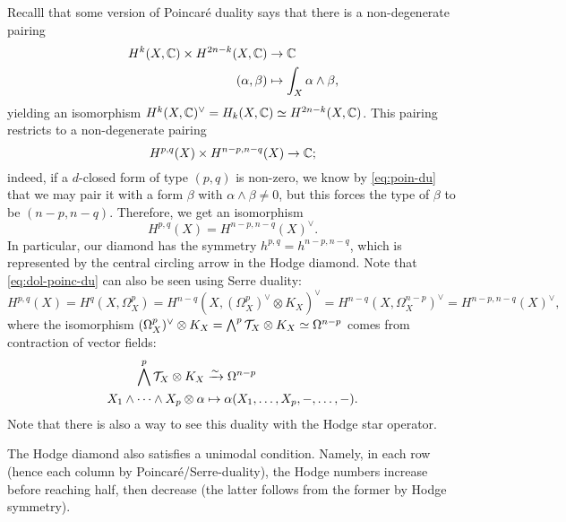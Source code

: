 \begin{remark}
	Recalll that some version of Poincaré duality says that there is a non-degenerate pairing
	\begin{align}
	H^k(X,\mathbb C)\times H^{2n-k}(X,\mathbb C)&\to \mathbb C\label{eq:poin-du}\\
	(\alpha,\beta)&\mapsto\int_X\alpha\wedge\beta,\notag
	\end{align}
	yielding an isomorphism $H^k(X,\mathbb C)^\vee=H_k(X,\mathbb C)\simeq H^{2n-k}(X,\mathbb C)$.  This pairing restricts to a non-degenerate pairing
	\[
	H^{p,q}(X)\times H^{n-p,n-q}(X)\to\mathbb C;
	\]
	indeed, if a $d$-closed form of type $(p,q)$ is non-zero, we know by \eqref{eq:poin-du} that we may pair it with a form $\beta$ with $\alpha\wedge\beta\neq 0$, but this forces the type of $\beta$ to be $(n-p,n-q)$. Therefore, we get an isomorphism
	\begin{equation}
	H^{p,q}(X)=H^{n-p,n-q}(X)^\vee.\label{eq:dol-poinc-du}
	\end{equation}
	 In particular, our diamond has the symmetry $h^{p,q}=h^{n-p,n-q}$, which is represented by the central circling arrow in the Hodge diamond. Note that \eqref{eq:dol-poinc-du} can also be seen using Serre duality:
	 \[
	 H^{p,q}(X)=H^q(X,\Omega_X^p)=H^{n-q}(X,(\Omega_X^p)^\vee\otimes K_X)^\vee=H^{n-q}(X,\Omega_X^{n-p})^\vee=H^{n-p,n-q}(X)^\vee,
	 \]
	where the isomorphism $(\Omega_X^p)^\vee\otimes K_X=\bigwedge^p\mathcal{T}_X\otimes K_X\simeq \Omega^{n-p}$ comes from contraction of vector fields:
	\begin{align*}
		\bigwedge^p\mathcal{T}_X\otimes K_X&\xrightarrow{\sim} \Omega^{n-p}\\
		X_1\wedge\cdots\wedge X_p\otimes \alpha&\mapsto \alpha(X_1,\dots,X_p,-,\dots,-).
	\end{align*}
	Note that there is also a way to see this duality with the Hodge star operator.
	
	The Hodge diamond also satisfies a unimodal condition. Namely, in each row (hence each column by Poincaré/Serre-duality), the Hodge numbers increase before reaching half, then decrease (the latter follows from the former by Hodge symmetry).
\end{remark}
%
